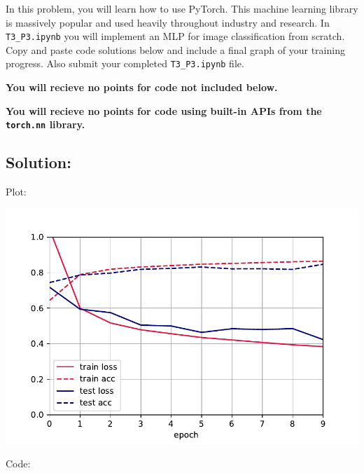 \documentclass[submit]{harvardml}
\begin{document}
\begin{problem}
  In this problem, you will learn how to use PyTorch. This machine learning library is massively popular and used heavily throughout industry and research. In \verb|T3_P3.ipynb| you will implement an MLP for image classification from scratch. Copy and paste code solutions below and include a final graph of your training progress. Also submit your completed \verb|T3_P3.ipynb| file.

  {\bfseries You will recieve no points for code not included below.}

  {\bfseries You will recieve no points for code using built-in APIs from the \verb|torch.nn| library.}
  
\end{problem}


\subsection*{Solution:}
Plot:

\includegraphics[width=\linewidth]{final_plot}

Code:
\end{document}
